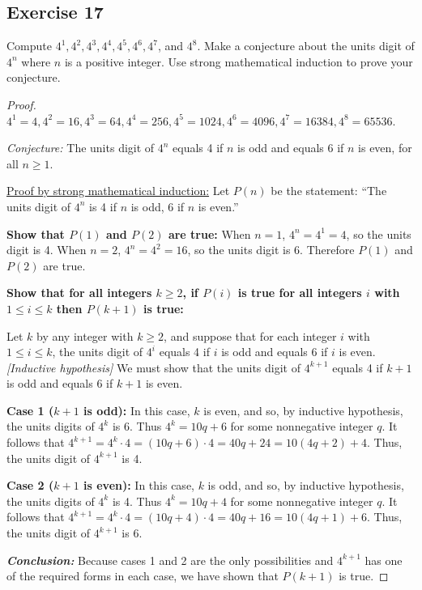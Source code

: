 \documentclass[14pt]{extarticle}
\begin{document}
\subsection{Exercise 17}
Compute $4^1, 4^2, 4^3, 4^4, 4^5, 4^6, 4^7$, and $4^8$. 
Make a conjecture about the units digit of $4^n$ where $n$ is a positive integer. 
Use strong mathematical induction to prove your conjecture.

\begin{proof}
$4^1 = 4, 4^2 = 16, 4^3 = 64, 4^4 = 256, 4^5 = 1024, 4^6 = 4096, 4^7 = 16384, 4^8 = 65536$.

{\it Conjecture:} 
The units digit of $4^n$ equals 4 if $n$ is odd and equals 6 if $n$ is even, 
for all $n \geq 1$.

\underline{Proof by strong mathematical induction:} 
Let $P(n)$ be the statement: 
``The units digit of $4^n$ is 4 if $n$ is odd, 6 if $n$ is even.''

{\bf Show that $P(1)$ and $P(2)$ are true:} 
When $n = 1$, $4^n = 4^1 = 4$, so the units digit is 4.
When $n = 2$, $4^n = 4^2 = 16$, so the units digit is 6.
Therefore $P(1)$ and $P(2)$ are true.

{\bf Show that for all integers $k \geq 2$, if $P(i)$ is true for all integers $i$ with $1 \leq i \leq k$ then $P(k+1)$ is true:}

Let $k$ by any integer with $k \geq 2$, and suppose that for each integer $i$ 
with $1 \leq i \leq k$, the units digit of $4^i$ equals 4 if $i$ is odd and 
equals 6 if $i$ is even. {\it [Inductive hypothesis]} 
We must show that the units digit of $4^{k+1}$ equals 4 
if $k + 1$ is odd and equals 6 if $k + 1$ is even.

{\bf Case 1 ($k + 1$ is odd):} In this case, $k$ is even,
and so, by inductive hypothesis, the units digits of $4^k$ is 6. 
Thus $4^k = 10q + 6$ for some nonnegative integer $q$. It follows that 
$4^{k+1} = 4^k \cdot 4 = (10q + 6) \cdot 4 = 40q + 24 = 10(4q + 2) + 4$. 
Thus, the units digit of $4^{k+1}$ is 4.

{\bf Case 2 ($k + 1$ is even):} In this case, $k$ is odd,
and so, by inductive hypothesis, the units digits of $4^k$ is 4. 
Thus $4^k = 10q + 4$ for some nonnegative integer $q$. It follows that 
$4^{k+1} = 4^k \cdot 4 = (10q + 4) \cdot 4 = 40q + 16 = 10(4q + 1) + 6$. 
Thus, the units digit of $4^{k+1}$ is 6.

{\bf\it Conclusion:} Because cases 1 and 2 are the only 
possibilities and $4^{k+1}$ has one of the required forms
in each case, we have shown that $P(k + 1)$ is true.
\end{proof}
\end{document}
